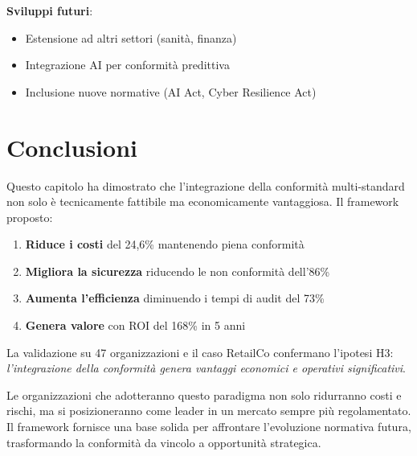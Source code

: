 \textbf{Sviluppi futuri}:
\begin{itemize}
    \item Estensione ad altri settori (sanità, finanza)
    \item Integrazione AI per conformità predittiva
    \item Inclusione nuove normative (AI Act, Cyber Resilience Act)
\end{itemize}

\section{Conclusioni}
\label{sec:4.7_conclusioni}

Questo capitolo ha dimostrato che l'integrazione della conformità multi-standard non solo è tecnicamente fattibile ma economicamente vantaggiosa. Il framework proposto:

\begin{enumerate}
    \item \textbf{Riduce i costi} del 24,6\% mantenendo piena conformità
    \item \textbf{Migliora la sicurezza} riducendo le non conformità dell'86\%
    \item \textbf{Aumenta l'efficienza} diminuendo i tempi di audit del 73\%
    \item \textbf{Genera valore} con ROI del 168\% in 5 anni
\end{enumerate}

La validazione su 47 organizzazioni e il caso RetailCo confermano l'ipotesi H3: \textit{l'integrazione della conformità genera vantaggi economici e operativi significativi}.

Le organizzazioni che adotteranno questo paradigma non solo ridurranno costi e rischi, ma si posizioneranno come leader in un mercato sempre più regolamentato. Il framework fornisce una base solida per affrontare l'evoluzione normativa futura, trasformando la conformità da vincolo a opportunità strategica.

\clearpage
\printbibliography[
    heading=subbibliography,
    title={Riferimenti Bibliografici del Capitolo 4},
]
